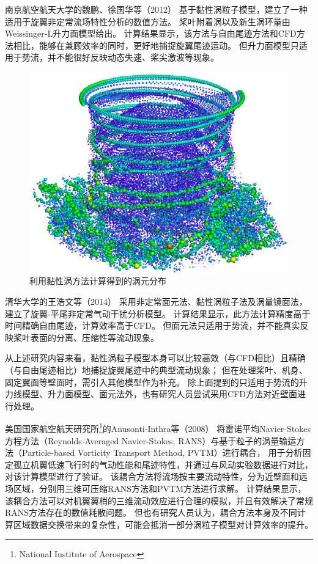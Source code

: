 \documentclass[doctor,openright,twoside,color]{buaathesis}
\begin{document}
南京航空航天大学的魏鹏、徐国华等（2012）
基于黏性涡粒子模型，建立了一种适用于旋翼非定常流场特性分析的数值方法。
桨叶附着涡以及新生涡环量由Weissinger-L升力面模型给出。
计算结果显示，该方法与自由尾迹方法和CFD方法相比，能够在兼顾效率的同时，更好地捕捉旋翼尾迹运动。
但升力面模型只适用于势流，并不能很好反映动态失速、桨尖激波等现象。
\begin{figure}[t!]
    \centering
    \includegraphics[height=0.3\textheight]{figures/vortex-particle.png}
    \caption{利用黏性涡方法计算得到的涡元分布}\label{vortex-particle}
\end{figure}

清华大学的王浩文等（2014）
采用非定常面元法、黏性涡粒子法及涡量镜面法，建立了旋翼-平尾非定常气动干扰分析模型。
计算结果显示，此方法计算精度高于时间精确自由尾迹，计算效率高于CFD。
但面元法只适用于势流，并不能真实反映桨叶表面的分离、压缩性等流动现象。

从上述研究内容来看，黏性涡粒子模型本身可以比较高效（与CFD相比）且精确（与自由尾迹相比）地捕捉旋翼尾迹中的典型流动现象；
但在处理桨叶、机身、固定翼面等壁面时，需引入其他模型作为补充。
除上面提到的只适用于势流的升力线模型、升力面模型、面元法外，也有研究人员尝试采用CFD方法对近壁面进行处理。

美国国家航空航天研究所\footnote{National Institute of Aerospace}的Anusonti-Inthra等（2008）
将雷诺平均Navier-Stokes方程方法（Reynolds-Averaged Navier-Stokes, RANS）与基于粒子的涡量输运方法（Particle-based Vorticity Transport Method, PVTM）进行耦合，
用于分析固定孤立机翼低速飞行时的气动性能和尾迹特性，并通过与风动实验数据进行对比，对该计算模型进行了验证。
该耦合方法将流场按主要流动特性，分为近壁面和远场区域，分别用三维可压缩RANS方法和PVTM方法进行求解。
计算结果显示，该耦合方法可以对机翼翼梢的三维流动效应进行合理的模拟，并且有效解决了常规RANS方法存在的数值耗散问题。
但也有研究人员认为，耦合方法本身及不同计算区域数据交换带来的复杂性，可能会抵消一部分涡粒子模型对计算效率的提升。
\end{document}
